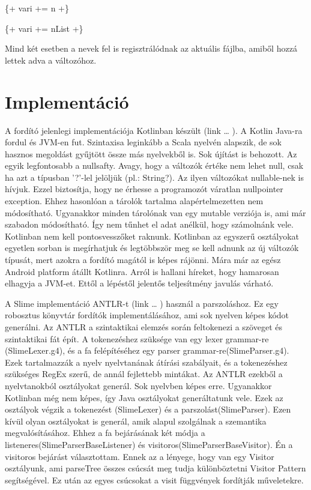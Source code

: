 {\{+ vari += n +\}

\{+ vari += nList +\}

Mind két esetben a nevek fel is regisztrálódnak az aktuális fájlba, amiből hozzá lettek adva a változóhoz.



\section{Implementáció}
\label{sec:SImplementation}
A fordító jelenlegi implementációja Kotlinban készült (link … ).
A Kotlin Java-ra fordul és JVM-en fut.
Szintaxisa leginkább a Scala nyelvén alapszik, de sok hasznos megoldást gyűjtött össze más nyelvekből is.
Sok újítást is behozott.
Az egyik legfontosabb a nullsafty.
Avagy, hogy a változók értéke nem lehet null, csak ha azt a típusban '?'-lel jelöljük (pl.: String?).
Az ilyen változókat nullable-nek is hívjuk.
Ezzel biztosítja, hogy ne érhesse a programozót váratlan nullpointer exception.
Ehhez hasonlóan a tárolók tartalma alapértelmezetten nem módosítható.
Ugyanakkor minden tárolónak van egy mutable verziója is, ami már szabadon módosítható.
Így nem tűnhet el adat anélkül, hogy számolnánk vele.
Kotlinban nem kell pontosvesszőket raknunk.
Kotlinban az egyszerű osztályokat egyetlen sorban is megírhatjuk és legtöbbször meg se kell adnunk az új változók típusát, mert azokra a fordító magától is képes rájönni.
Mára már az egész Android platform átállt Kotlinra.
Arról is hallani híreket, hogy hamarosan elhagyja a JVM-et.
Ettől a lépéstől jelentős teljesítmény javulás várható.

A Slime implementáció ANTLR-t (link … ) használ a parszoláshoz.
Ez egy robosztus könyvtár fordítók implementálásához, ami sok nyelven képes kódot generálni. 
Az ANTLR a szintaktikai elemzés során feltokenezi a szöveget és szintaktikai fát épít. 
A tokenezéshez szüksége van egy lexer grammar-re (SlimeLexer.g4), és a fa felépítéséhez egy parser grammar-re(SlimeParser.g4). 
Ezek tartalmazzák a nyelv nyelvtanának átírási szabályait, és a tokenezéshez szükséges RegEx szerű, de annál fejlettebb mintákat. 
Az ANTLR ezekből a nyelvtanokból osztályokat generál. 
Sok nyelvben képes erre. 
Ugyanakkor Kotlinban még nem képes, így Java osztályokat generáltatunk vele. 
Ezek az osztályok végzik a tokenezést (SlimeLexer) és a parszolást(SlimeParser). 
Ezen kívül olyan osztályokat is generál, amik alapul szolgálnak a  szemantika megvalósításához. 
Ehhez a fa bejárásának két módja a listeneres(SlimeParserBaseListener) és visitoros(SlimeParserBaseVisitor).
Én a visitoros bejárást választottam. 
Ennek az a lényege, hogy van egy Visitor osztályunk, ami parseTree összes csúcsát meg tudja különböztetni Visitor Pattern segítségével.
Ez után az egyes csúcsokat a visit függvények fordítják műveletekre.

}
